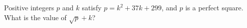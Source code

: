 Positive integers $p$ and $k$ satisfy $p=k^2+37k+299$, and $p$ is a perfect square. What is the value of $\sqrt p+k$?
